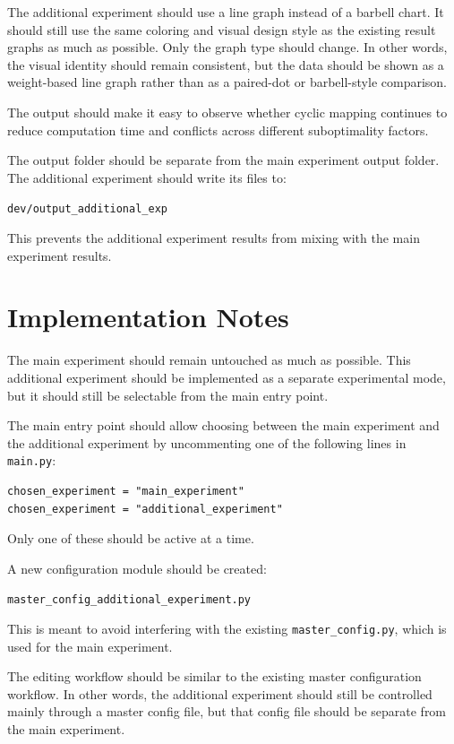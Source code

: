 \documentclass[11pt,a4paper]{article}
\begin{document}
The additional experiment should use a line graph instead of a barbell chart. It should still use the same coloring and visual design style as the existing result graphs as much as possible. Only the graph type should change. In other words, the visual identity should remain consistent, but the data should be shown as a weight-based line graph rather than as a paired-dot or barbell-style comparison.

The output should make it easy to observe whether cyclic mapping continues to reduce computation time and conflicts across different suboptimality factors.

The output folder should be separate from the main experiment output folder. The additional experiment should write its files to:

\begin{center}
\texttt{dev/output\_additional\_exp}
\end{center}

This prevents the additional experiment results from mixing with the main experiment results.

\section*{Implementation Notes}

The main experiment should remain untouched as much as possible. This additional experiment should be implemented as a separate experimental mode, but it should still be selectable from the main entry point.

The main entry point should allow choosing between the main experiment and the additional experiment by uncommenting one of the following lines in \texttt{main.py}:

\begin{verbatim}
chosen_experiment = "main_experiment"
chosen_experiment = "additional_experiment"
\end{verbatim}

Only one of these should be active at a time.

A new configuration module should be created:

\begin{center}
\texttt{master\_config\_additional\_experiment.py}
\end{center}

This is meant to avoid interfering with the existing \texttt{master\_config.py}, which is used for the main experiment.

The editing workflow should be similar to the existing master configuration workflow. In other words, the additional experiment should still be controlled mainly through a master config file, but that config file should be separate from the main experiment.
\end{document}
